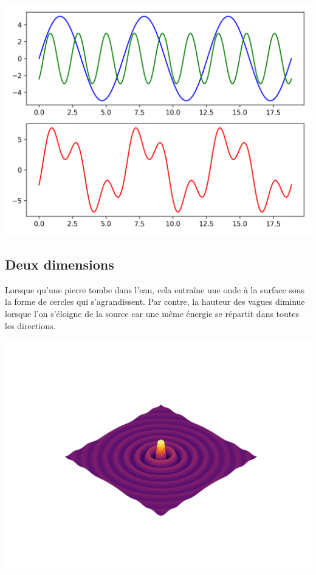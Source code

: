\documentclass[11pt,class=report,crop=false]{standalone}
\begin{document}
\begin{center}
	\includegraphics[scale=\myscale,scale=0.5]{figures/ondes_superposition}
\end{center}


\subsection{Deux dimensions}

Lorsque qu'une pierre tombe dans l'eau, cela entraîne  une onde à la surface sous la forme de cercles qui s'agrandissent. Par contre, la hauteur des vagues diminue lorsque l'on s'éloigne de la source car une même énergie se répartit dans toutes les directions.

\begin{center}		
	\includegraphics[scale=\myscale,scale=0.8,trim={0 2.5cm 0 3cm},clip]{figures/ondes2D-2}	
\end{center}
\end{document}

